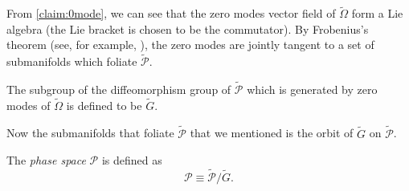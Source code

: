 \documentclass[10pt]{article}
\begin{document}
From \cref{claim:0mode}, we can see that the zero modes vector field of $\widetilde{\Omega}$ form a Lie algebra (the Lie bracket is chosen to be the commutator).
By Frobenius's theorem (see, for example, \cite{Wald:1984rg}), the zero modes are jointly tangent to a set of submanifolds which foliate $\widetilde{\mathcal{P}}$.
\begin{definition}
    The subgroup of the diffeomorphism group of $\widetilde{\mathcal{P}}$ which is generated by zero modes of $\widetilde{\Omega}$ is defined to be $\widetilde{G}$.
\end{definition}
Now the submanifolds that foliate $\widetilde{\mathcal{P}}$ that we mentioned is the orbit of $\widetilde{G}$ on $\widetilde{\mathcal{P}}$.
\begin{definition}
    The \textit{phase space} $\mathcal{P}$ is defined as
    \begin{equation}
        \mathcal{P}\equiv\widetilde{\mathcal{P}}/\widetilde{G}.
    \end{equation}
\end{definition}
\end{document}
